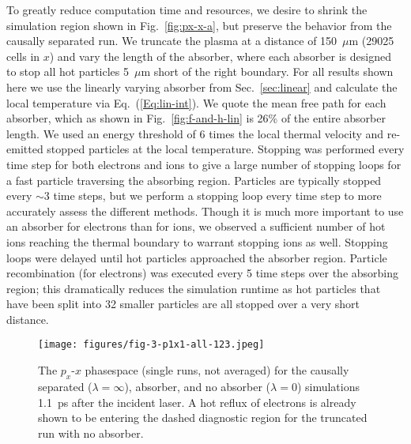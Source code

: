 \documentclass[../absorber.tex]{subfiles}
\begin{document}
To greatly reduce computation time and resources, we desire to shrink the simulation region shown in Fig.~\ref{fig:px-x-a}, but preserve the behavior from the causally separated run.  We truncate the plasma at a distance of 150~$\mu$m (29025 cells in $x$) and vary the length of the absorber, where each absorber is designed to stop all hot particles 5~$\mu$m short of the right boundary.  For all results shown here we use the linearly varying absorber from Sec.~\ref{sec:linear} and calculate the local temperature via Eq.~(\ref{Eq:lin-int}).  We quote the mean free path for each absorber, which as shown in Fig.~\ref{fig:f-and-h-lin} is 26\% of the entire absorber length.  We used an energy threshold of 6 times the local thermal velocity and re-emitted stopped particles at the local temperature.  Stopping was performed every time step for both electrons and ions
to give a large number of stopping loops for a fast particle traversing the absorbing region.  Particles are typically stopped every $\sim3$ time steps, but we perform a stopping loop every time step to more accurately assess the different methods.  Though it is much more important to use an absorber for electrons than for ions, we observed a sufficient number of hot ions reaching the thermal boundary to warrant stopping ions as well.  Stopping loops were delayed until hot particles approached the absorber region.  Particle recombination (for electrons) was executed every 5 time steps over the absorbing region; this dramatically reduces the simulation runtime as hot particles that have been split into 32 smaller particles are all stopped over a very short distance.

\begin{figure}
\texttt{[image: figures/fig-3-p1x1-all-123.jpeg]}
\caption{\label{fig:px-x-1.1} The $p_x$-$x$ phasespace (single runs, not averaged) for the causally separated ($\lambda=\infty$), absorber, and no absorber ($\lambda=0$) simulations 1.1~ps after the incident laser.  A hot reflux of electrons is already shown to be entering the dashed diagnostic region for the truncated run with no absorber.}
\end{figure}

\end{document}
